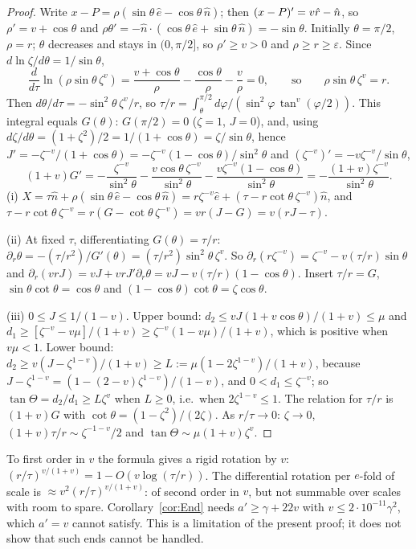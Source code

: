 \begin{proof}
Write $x-P=\rho(\sin\theta\,\hat e-\cos\theta\,\hat n)$; then $(x-P)'=v\hat r-\hat n$, so $\rho'=v+\cos\theta$ and
$\rho\theta'=-\hat n\cdot(\cos\theta\,\hat e+\sin\theta\,\hat n)=-\sin\theta$. Initially $\theta=\pi/2$, $\rho=r$; $\theta$ decreases
and stays in $(0,\pi/2]$, so $\rho'\ge v>0$ and $\rho\ge r\ge\varepsilon$. Since $d\ln\zeta/d\theta=1/\sin\theta$,
\[
\frac{d}{d\tau}\ln(\rho\sin\theta\,\zeta^v)=\frac{v+\cos\theta}\rho-\frac{\cos\theta}\rho-\frac v\rho=0,\qquad\text{so}\qquad
\rho\sin\theta\,\zeta^v=r .
\]
Then $d\theta/d\tau=-\sin^2\!\theta\,\zeta^v/r$, so $\tau/r=\int_\theta^{\pi/2}d\varphi/(\sin^2\!\varphi\,\tan^v(\varphi/2))$. This
integral equals $G(\theta)$: $G(\pi/2)=0$ ($\zeta=1$, $J=0$), and, using $d\zeta/d\theta=(1+\zeta^2)/2=1/(1+\cos\theta)=\zeta/\sin\theta$,
hence $J'=-\zeta^{-v}/(1+\cos\theta)=-\zeta^{-v}(1-\cos\theta)/\sin^2\!\theta$ and $(\zeta^{-v})'=-v\zeta^{-v}/\sin\theta$,
\[
(1+v)G'=-\frac{\zeta^{-v}}{\sin^2\!\theta}-\frac{v\cos\theta\,\zeta^{-v}}{\sin^2\!\theta}-\frac{v\zeta^{-v}(1-\cos\theta)}{\sin^2\!\theta}
=-\frac{(1+v)\zeta^{-v}}{\sin^2\!\theta}.
\]
(i) $X=\tau\hat n+\rho(\sin\theta\,\hat e-\cos\theta\,\hat n)=r\zeta^{-v}\hat e+(\tau-r\cot\theta\,\zeta^{-v})\hat n$, and
$\tau-r\cot\theta\,\zeta^{-v}=r(G-\cot\theta\,\zeta^{-v})=vr(J-G)=v(rJ-\tau)$.

(ii) At fixed $\tau$, differentiating $G(\theta)=\tau/r$: $\partial_r\theta=-(\tau/r^2)/G'(\theta)=(\tau/r^2)\sin^2\!\theta\,\zeta^v$.
So $\partial_r(r\zeta^{-v})=\zeta^{-v}-v(\tau/r)\sin\theta$ and
$\partial_r(vrJ)=vJ+vrJ'\partial_r\theta=vJ-v(\tau/r)(1-\cos\theta)$. Insert $\tau/r=G$, $\sin\theta\cot\theta=\cos\theta$ and
$(1-\cos\theta)\cot\theta=\zeta\cos\theta$.

(iii) $0\le J\le1/(1-v)$. Upper bound: $d_2\le vJ(1+v\cos\theta)/(1+v)\le\mu$ and
$d_1\ge[\zeta^{-v}-v\mu]/(1+v)\ge\zeta^{-v}(1-v\mu)/(1+v)$, which is positive when $v\mu<1$. Lower bound:
$d_2\ge v(J-\zeta^{1-v})/(1+v)\ge L:=\mu(1-2\zeta^{1-v})/(1+v)$, because $J-\zeta^{1-v}=(1-(2-v)\zeta^{1-v})/(1-v)$, and
$0<d_1\le\zeta^{-v}$; so $\tan\Theta=d_2/d_1\ge L\zeta^v$ when $L\ge0$, i.e.\ when $2\zeta^{1-v}\le1$. The relation for $\tau/r$ is
$(1+v)G$ with $\cot\theta=(1-\zeta^2)/(2\zeta)$. As $r/\tau\to0$: $\zeta\to0$, $(1+v)\tau/r\sim\zeta^{-1-v}/2$ and
$\tan\Theta\sim\mu(1+v)\zeta^v$.
\end{proof}

\begin{remark}\label{rem:E-trans}
To first order in $v$ the formula gives a rigid rotation by $v$: $(r/\tau)^{v/(1+v)}=1-O(v\log(\tau/r))$. The differential rotation
per $e$-fold of scale is $\approx v^2(r/\tau)^{v/(1+v)}$: of second order in $v$, but not summable over scales with room to spare.
Corollary~\ref{cor:End} needs $a'\ge\gamma+22v$ with $v\le2\cdot10^{-11}\gamma^2$, which $a'=v$ cannot satisfy. This is a limitation
of the present proof; it does not show that such ends cannot be handled.
\end{remark}

